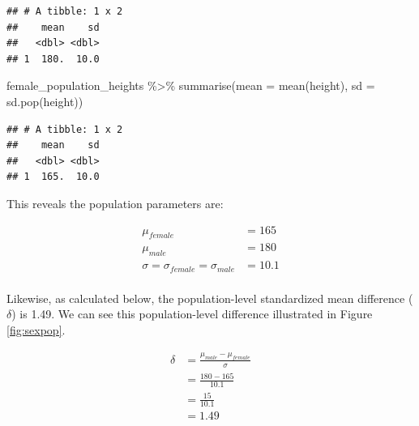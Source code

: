 \documentclass[
]{krantz}
\makeatletter
\newenvironment{Shaded}{\begin{snugshade}}{\end{snugshade}}
\newcommand{\AttributeTok}[1]{\textcolor[rgb]{0.61,0.61,0.61}{#1}}
\newcommand{\FunctionTok}[1]{\textcolor[rgb]{0,0,0}{#1}}
\newcommand{\NormalTok}[1]{#1}
\newcommand{\SpecialCharTok}[1]{\textcolor[rgb]{0,0,0}{#1}}
\newenvironment{kframe}{%
\medskip{}
\setlength{\fboxsep}{.8em}
 \def\at@end@of@kframe{}%
 \ifinner\ifhmode%
  \def\at@end@of@kframe{\end{minipage}}%
  \begin{minipage}{\columnwidth}%
 \fi\fi%
 \def\FrameCommand##1{\hskip\@totalleftmargin \hskip-\fboxsep
 \colorbox{shadecolor}{##1}\hskip-\fboxsep
     \hskip-\linewidth \hskip-\@totalleftmargin \hskip\columnwidth}%
 \MakeFramed {\advance\hsize-\width
   \@totalleftmargin\z@ \linewidth\hsize
   \@setminipage}}%
 {\par\unskip\endMakeFramed%
 \at@end@of@kframe}
\renewenvironment{Shaded}{\begin{kframe}}{\end{kframe}}
\makeatother
\begin{document}
\begin{verbatim}
## # A tibble: 1 x 2
##    mean    sd
##   <dbl> <dbl>
## 1  180.  10.0
\end{verbatim}

\begin{Shaded}
\begin{Highlighting}[]
\NormalTok{female\_population\_heights }\SpecialCharTok{\%\textgreater{}\%} 
  \FunctionTok{summarise}\NormalTok{(}\AttributeTok{mean =} \FunctionTok{mean}\NormalTok{(height),}
            \AttributeTok{sd =} \FunctionTok{sd.pop}\NormalTok{(height))}
\end{Highlighting}
\end{Shaded}

\begin{verbatim}
## # A tibble: 1 x 2
##    mean    sd
##   <dbl> <dbl>
## 1  165.  10.0
\end{verbatim}

This reveals the population parameters are:

\[
\begin{aligned} 
\mu_{female} &= 165 \\
\mu_{male} &= 180 \\
\sigma = \sigma_{female} = \sigma_{male} &= 10.1\\
\end{aligned} 
\]

Likewise, as calculated below, the population-level standardized mean difference (\(\delta\)) is 1.49. We can see this population-level difference illustrated in Figure \ref{fig:sexpop}.

\[
\begin{aligned} 
\delta  &= \frac{\mu_{male} - \mu_{female}}{\sigma} \\
&= \frac{180 - 165}{10.1} \\
&= \frac{15}{10.1} \\
&= 1.49 \\
\end{aligned} 
\]
\end{document}

